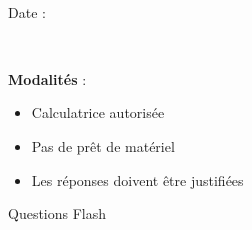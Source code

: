 \documentclass[a4paper,11pt,fleqn]{article}
\begin{document}
\setcounter{pagecounter}{0}
\setcounter{ExoMA}{0}

\def\points{\phantom{AAA}}
\def\difficulty{\phantom{AAA}}


\vspace{-0.2cm}
\begin{minipage}[t]{0.5\textwidth}%
    \tableaucompetenceEval{
    }
\end{minipage}
\hfill
\begin{minipage}[t]{0.415\textwidth}
    \begin{minipage}[t]{0.75\textwidth}
        \phantom{a}\\
        Date : \repsim[3.5cm]{}\hfill \vrule \hfill {}
    \end{minipage}\\
    \begin{minipage}[t]{\textwidth}
        \textbf{Modalités} :
        \begin{itemize}[label=$\bullet$]
            \item Calculatrice autorisée%
            \item Pas de prêt de matériel
            \item Les réponses doivent être justifiées
        \end{itemize}
    \end{minipage}
\end{minipage}
\begin{EXO}{Questions Flash}{}
    \begin{enumerate}
    \end{enumerate}


\exocorrection

\begin{enumerate}
\end{enumerate}

\end{EXO}
\end{document}
